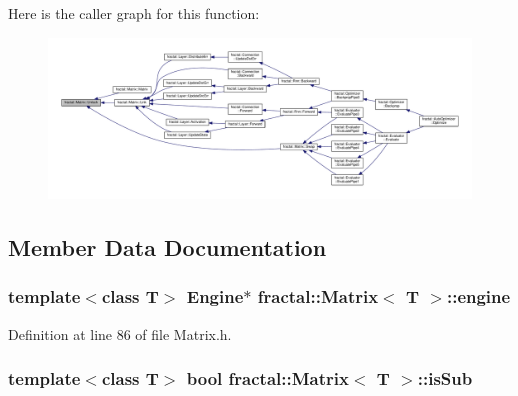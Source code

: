 Here is the caller graph for this function\+:\nopagebreak
\begin{figure}[H]
\begin{center}
\leavevmode
\includegraphics[width=350pt]{da/db4/classfractal_1_1Matrix_a701c094fe728e9f83aaafe109e9e921f_icgraph}
\end{center}
\end{figure}




\subsection{Member Data Documentation}
\hypertarget{classfractal_1_1Matrix_a8cd6330ad7742ba28aca98d2a6be185d}{
\subsubsection[{engine}]{\setlength{\rightskip}{0pt plus 5cm}template$<$class T$>$ {\bf Engine}$\ast$ {\bf fractal\+::\+Matrix}$<$ T $>$\+::engine\hspace{0.3cm}{\ttfamily [protected]}}}\label{classfractal_1_1Matrix_a8cd6330ad7742ba28aca98d2a6be185d}


Definition at line 86 of file Matrix.\+h.

\hypertarget{classfractal_1_1Matrix_aacf488b80d376418358035986c1041ef}{
\subsubsection[{is\+Sub}]{\setlength{\rightskip}{0pt plus 5cm}template$<$class T$>$ bool {\bf fractal\+::\+Matrix}$<$ T $>$\+::is\+Sub\hspace{0.3cm}{\ttfamily [protected]}}}\label{classfractal_1_1Matrix_aacf488b80d376418358035986c1041ef}



